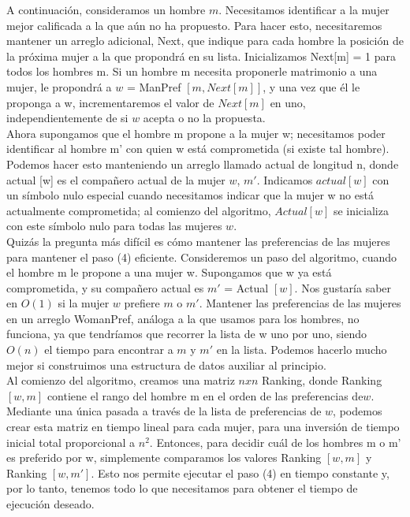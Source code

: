 \documentclass[a4paper]{article}
\begin{document}
A continuación, consideramos un hombre $m$. Necesitamos identificar a la mujer mejor calificada a la que aún no ha propuesto. Para hacer esto, necesitaremos mantener un arreglo adicional, Next, que indique para cada hombre la posición de la próxima mujer a la que propondrá en su lista. Inicializamos Next[m] = 1 para todos los hombres m. Si un hombre m necesita proponerle matrimonio a una mujer, le propondrá a $w$ = ManPref $[m, Next [m]]$, y una vez que él le proponga a w, incrementaremos el valor de $Next[m]$ en uno, independientemente de si $w$ acepta o no la propuesta.\\

Ahora supongamos que el hombre m propone a la mujer w; necesitamos poder identificar al hombre m’ con quien w está comprometida (si existe tal hombre). Podemos hacer esto manteniendo un arreglo llamado actual de longitud n, donde actual [w] es el compañero actual de la mujer $w$, $m'$. Indicamos $actual[w]$ con un símbolo nulo especial cuando necesitamos indicar que la mujer w no está actualmente comprometida; al comienzo del algoritmo, $Actual[w]$ se inicializa con este símbolo nulo para todas las mujeres $w$.\\

Quizás la pregunta más difícil es cómo mantener las preferencias de las mujeres para mantener el paso (4) eficiente. Consideremos un paso del algoritmo, cuando el hombre m le propone a una mujer w. Supongamos que w ya está comprometida, y su compañero actual es $m'$ = Actual $[w]$. Nos gustaría saber en $O(1)$ si la mujer $w$ prefiere $m$ o $m'$. Mantener las preferencias de las mujeres en un arreglo WomanPref, análoga a la que usamos para los hombres, no funciona, ya que tendríamos que recorrer la lista de w uno por uno, siendo $O(n)$ el tiempo para encontrar a $m$ y $m'$ en la lista. Podemos hacerlo mucho mejor si construimos una estructura de datos auxiliar al principio.\\


Al comienzo del algoritmo, creamos una matriz $n x n$ Ranking, donde Ranking$[w, m]$ contiene el rango del hombre m en el orden de las preferencias de$w$. Mediante una única pasada a través de la lista de preferencias de $w$, podemos crear esta matriz en tiempo lineal para cada mujer, para una inversión de tiempo inicial total proporcional a $n^2$. Entonces, para decidir cuál de los hombres m o m' es preferido por w, simplemente comparamos los valores Ranking $[w, m]$ y Ranking $[w, m']$. Esto nos permite ejecutar el paso (4) en tiempo constante y, por lo tanto, tenemos todo lo que necesitamos para obtener el tiempo de ejecución deseado.\\
\end{document}

